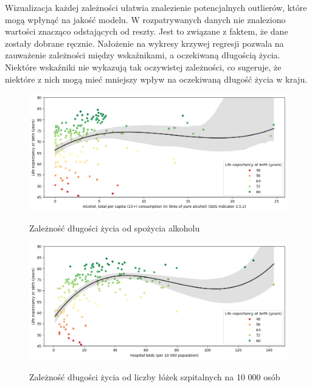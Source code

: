 \documentclass{article}
\begin{document}
\begin{enumerate}
    Wizualizacja każdej zależności ułatwia znalezienie potencjalnych outlierów, które mogą wpłynąć na jakość modelu.
    W rozpatrywanych danych nie znaleziono wartości znacząco odstających od reszty. Jest to związane z 
    faktem, że dane zostały dobrane ręcznie.
    Nałożenie na wykresy krzywej regresji pozwala na zauważenie zależności między wskaźnikami, a oczekiwaną długością życia.
    Niektóre wskaźniki nie wykazują tak oczywistej zależności, co sugeruje, 
    że niektóre z nich mogą mieć mniejszy wpływ na oczekiwaną długość życia w kraju.
    \begin{figure}[H]
        \begin{minipage}[t]{0.48\textwidth}
            \label{fig:alcohol_consumption}
            \includegraphics[width=\textwidth]{graphs/alcohol_consumption.png}
            \caption{Zależność długości życia od spożycia alkoholu}
            \centering
        \end{minipage}
        \hfill
        \begin{minipage}[t]{0.48\textwidth}
            \label{fig:hospital_beds}
            \includegraphics[width=\textwidth]{graphs/hospital_beds.png}
            \caption{Zależność długości życia od liczby łóżek szpitalnych na 10 000 osób}
            \centering
        \end{minipage}
    \end{figure}


\end{enumerate}
\end{document}

